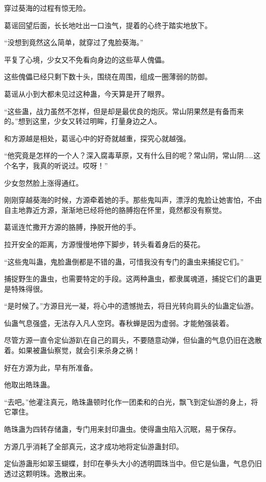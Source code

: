 
\begin{this_body}

穿过葵海的过程有惊无险。

葛谣回望后面，长长地吐出一口浊气，提着的心终于踏实地放下。

“没想到竟然这么简单，就穿过了鬼脸葵海。”

平复了心境，少女又不免看向身边的这些草人傀儡。

这些傀儡已经只剩下数十头，围绕在周围，组成一圈薄弱的防御。

葛谣从小到大都未见过这种蛊，今天算是开了眼界。

“这些蛊，战力虽然不怎样，但是却是最优良的炮灰。常山阴果然是有备而来的。”想到这里，少女又转过明眸，打量身边之人。

和方源越是相处，葛谣心中的好奇就越重，探究心就越强。

“他究竟是怎样的一个人？深入腐毒草原，又有什么目的呢？常山阴，常山阴……这个名字，我真的听说过。哎呀！”

少女忽然脸上涨得通红。

刚刚穿越葵海的时候，方源牵着她的手。那些鬼叫声，漂浮的鬼脸让她害怕，不由自主地靠近方源，渐渐地已经将他的胳膊抱在怀里，竟然都没有察觉。

葛谣连忙撒开方源的胳膊，挣脱开他的手。

拉开安全的距离，方源慢慢地停下脚步，转头看着身后的葵花。

“这些鬼叫蛊，鬼脸蛊倒都是不错的蛊，可惜我没有专门的蛊虫来捕捉它们。”

捕捉野生的蛊虫，也需要特定的手段。这两种蛊虫，都隶属魂道，捕捉它们的蛊更是特殊得很。

“是时候了。”方源目光一凝，将心中的遗憾抛去，将目光转向肩头的仙蛊定仙游。

仙蛊气息强盛，无法存入凡人空窍。春秋蝉是因为虚弱。才能勉强装着。

尽管方源一直令定仙游趴在自己的肩头，不要随意动弹，但仙蛊的气息仍旧在逸散着。如果被蛊仙察觉，就会引来杀身之祸！

好在方源为此，早有所准备。

他取出皓珠蛊。

“去吧。”他灌注真元，皓珠蛊顿时化作一团柔和的白光，飘飞到定仙游的身上，将它罩住。

皓珠蛊为四转存储蛊，专门用来封印蛊虫。使得蛊虫陷入沉眠，易于保存。

方源几乎消耗了全部真元，这才成功地将定仙游蛊封印。

定仙游蛊形如翠玉蝴蝶，封印在拳头大小的透明圆珠当中。但它是仙蛊，气息仍旧透过这颗明珠。逸散出来。


\end{this_body}
